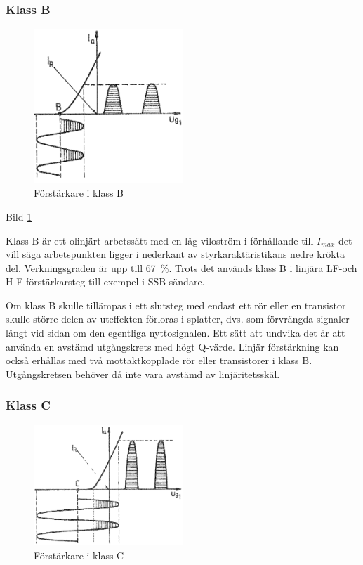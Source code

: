 \subsubsection{Klass B}

\begin{figure}
\includegraphics[width=0.5\textwidth]{images/cropped_pdfs/bild_2_3-45.pdf}
\caption{Förstärkare i klass B}
\label{fig:BildII3-45}
\end{figure}

Bild \ref{fig:BildII3-45}

Klass B är ett olinjärt arbetssätt med en låg viloström i förhållande
till \(I_{max}\) det vill säga arbetspunkten ligger i nederkant av
styrkaraktäristikans nedre krökta del. Verkningsgraden är upp till
67~\%. Trots det används klass B i linjära LF-och H F-förstärkarsteg
till exempel i SSB-sändare.

Om klass B skulle tillämpas i ett slutsteg med endast ett rör eller en
transistor skulle större delen av uteffekten förloras i splatter,
dvs. som förvrängda signaler långt vid sidan om den egentliga nyttosignalen.
Ett sätt att undvika det är att använda en avstämd utgångskrets med högt
Q-värde.
Linjär förstärkning kan också erhållas med två mottaktkopplade rör eller
transistorer i klass B.
Utgångskretsen behöver då inte vara avstämd av linjäritetsskäl.

\subsubsection{Klass C}

\begin{figure}
\includegraphics[width=0.5\textwidth]{images/cropped_pdfs/bild_2_3-46.pdf}
\caption{Förstärkare i klass C}
\label{fig:BildII3-46}
\end{figure}

